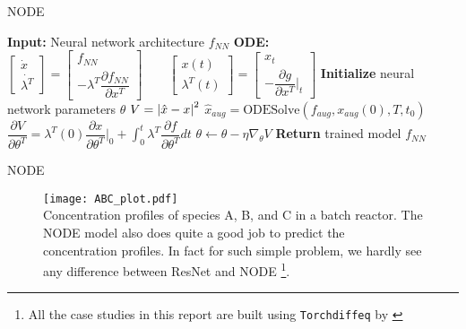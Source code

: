 \documentclass[dvipsnames, 9pt]{beamer}
\begin{document}
\begin{frame}{NODE}
    \begin{algorithmic}[1]
        \State \textbf{Input:} Neural network architecture $f_{NN}$
        \State \textbf{ODE:} 
        $
            \begin{bmatrix} \dot{x} \\ \dot{\lambda^T} \end{bmatrix} = 
            \begin{bmatrix} f_{NN} \\ -\lambda^T \dfrac{\partial f_{NN}}{\partial x^T}\end{bmatrix}
            \qquad
            \begin{bmatrix} x(t) \\ \lambda^T(t) \end{bmatrix} =
            \begin{bmatrix} x_t \\ - \dfrac{\partial g}{\partial x^T}|_{t} \end{bmatrix}
            \label{eq:augsens}
        $
        \State \textbf{Initialize} neural network parameters $\theta$
        \Repeat
            \State $V = \left| \hat{x} - x \right|^2$
            \State $\hat{x}_{aug} = \text{ODESolve}(f_{aug}, x_{aug}(0), T, t_0)$
            \State $\dfrac{\partial V}{\partial \theta^T} = \lambda^T(0)\dfrac{\partial x}{\partial \theta^T}|_0 + \int_0^t   \lambda^T \dfrac{\partial f}{\partial \theta^T} dt$
            \State $\theta \leftarrow \theta - \eta \nabla_{\theta} V$
        \State \textbf{Return} trained model $f_{NN}$
        \end{algorithmic}        
\end{frame}

\begin{frame}{NODE}
    \begin{figure}
        \centering
        \texttt{[image: ABC\_plot.pdf]}\\
        Concentration profiles of species A, B, and C in a batch reactor. The
    NODE model also does quite a good job to predict the concentration profiles. 
    In fact for such simple problem, we hardly see any difference between ResNet and NODE
    \footnote{All the case studies in this report are built using \texttt{Torchdiffeq} by \cite{torchdiffeq}}.
    \end{figure}
\end{frame}
\end{document}
